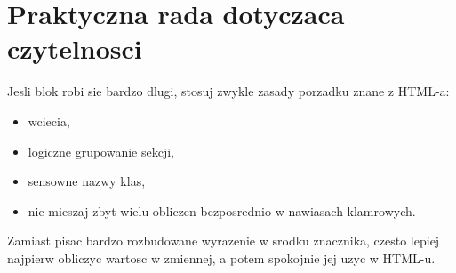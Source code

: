 \section{Praktyczna rada dotyczaca czytelnosci}
Jesli blok  robi sie bardzo dlugi, stosuj zwykle zasady porzadku znane z HTML-a:

\begin{itemize}
  \item wciecia,
  \item logiczne grupowanie sekcji,
  \item sensowne nazwy klas,
  \item nie mieszaj zbyt wielu obliczen bezposrednio w nawiasach klamrowych.
\end{itemize}

Zamiast pisac bardzo rozbudowane wyrazenie w srodku znacznika, czesto lepiej najpierw
obliczyc wartosc w zmiennej, a potem spokojnie jej uzyc w HTML-u.
